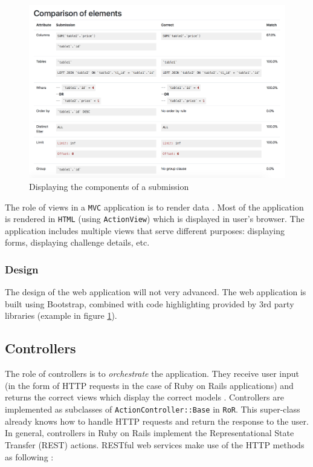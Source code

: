 \begin{figure}[H]
\centering
\includegraphics[width=\textwidth]{Chapters/4-Design/components.png}
\caption{Displaying the components of a submission}
\label{fig:design}
\end{figure}


The role of views in a \texttt{MVC} application is to render data \citep{ruby_on_rails}. Most of the application is rendered in \texttt{HTML} (using \texttt{ActionView}) which is displayed in user's browser. The application includes multiple views that serve different purposes: displaying forms, displaying challenge details, etc.

\subsubsection{Design}

The design of the web application will not very advanced. The web application is built using Bootstrap, combined with code highlighting provided by 3rd party libraries (example in figure \ref{fig:design}).


\subsection{Controllers} \label{ch:design:web:controller}

The role of controllers is to \textit{orchestrate} the application. They receive user input (in the form of HTTP requests in the case of Ruby on Rails applications) and returns the correct views which display the correct models \citep{ruby_on_rails_book}. Controllers are implemented as subclasses of \texttt{ActionController::Base} in \texttt{RoR}. This super-class already knows how to handle HTTP requests and return the response to the user. In general, controllers in Ruby on Rails implement the Representational State Transfer (REST) actions. RESTful web services make use of the HTTP methods as following \citep{rodriguez2008restful}:

